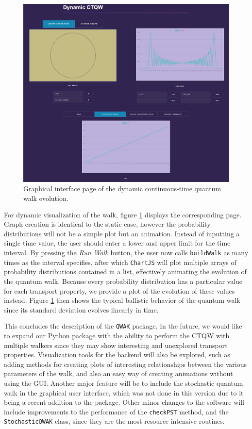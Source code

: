 \documentclass[main.tex]{subfiles}
\begin{document}
\begin{figure}[!h]
  \centering
  \includegraphics[scale=0.4]{img/QWAK/qwakGuiDynamicQW.png}
  \caption{Graphical interface page of the dynamic continuous-time quantum walk evolution.}
  \label{fig:guiDynamicPage}
\end{figure}

For dynamic visualization of the walk, figure \ref{fig:guiDynamicPage} displays
the corresponding page. Graph creation is identical to the static case, however
the probability distributions will not be a simple plot but an animation.
Instead of inputting a single time value, the user should enter a lower and
upper limit for the time interval. By pressing the \textit{Run Walk} button,
the user now calls \texttt{buildWalk} as many times as the interval specifies,
after which \texttt{ChartJS} will plot multiple arrays of probability
distributions contained in a list, effectively animating the evolution of the
quantum walk. Because every probability distribution has a particular value for
each transport property, we provide a plot of the evolution of these
values instead. Figure \ref{fig:guiDynamicPage} then shows the typical ballistic
behavior of the quantum walk since its standard deviation evolves linearly in
time. 

This concludes the description of the \texttt{QWAK} package. In the future, we
would like to expand our Python package with the ability to perform the CTQW
with multiple walkers since they may show interesting and unexplored transport
properties. Visualization tools for the backend will also be explored, such as
adding methods for creating plots of interesting relationships between the
various parameters of the walk, and also an easy way of creating animations
without using the GUI. Another major feature will be to include the stochastic
quantum walk in the graphical user interface, which was not done in this
version due to it being a recent addition to the package. Other minor changes
to the software will include improvements to the performance of the \texttt{checkPST}
method, and the \texttt{StochasticQWAK} class, since they are the most resource
intensive routines. 
\end{document}
